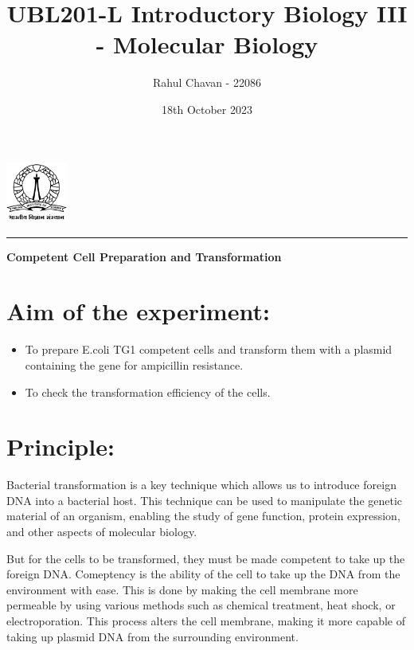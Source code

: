 \documentclass{report}
\title{\textbf{UBL201-L Introductory Biology III - Molecular Biology}}
\author{Rahul Chavan - 22086}
\date{18th October 2023}
\renewcommand{\maketitle}{
 \begin{center}
    \includegraphics[width=2cm]{IISc_Master_Seal_Black.jpg}
    \vspace{0.5cm}

    \Large
    \textbf{\thetitle}
    
    \vspace{0.5cm}
    
    \Large
    \theauthor
    
    \vspace{0.2cm}
    
    \large
    \thedate

    \vspace{0.5cm}

    \hrule  
    
  \end{center}
}
\begin{document}
\maketitle
\begin{center}
    \Large
    \textbf{Competent Cell Preparation and Transformation}
\end{center} 








\section*{Aim of the experiment:}
\begin{itemize}
  \item To prepare E.coli TG1 competent cells and transform them with a plasmid containing the gene for ampicillin resistance.  
  \item To check the transformation efficiency of the cells.
\end{itemize}

\section*{Principle:} 
Bacterial transformation is a key technique which allows us to introduce foreign DNA into a bacterial host.
This technique can be used to manipulate the genetic material of an organism, enabling the study of gene function,
protein expression, and other aspects of molecular biology. 

But for the cells to be transformed, they must be made competent to take up the foreign DNA.
Comeptency is the ability of the cell to take up the DNA from the environment with ease.
This is done by making the cell membrane more permeable by using various methods such as chemical treatment,
heat shock, or electroporation. This process alters the cell membrane, making it more capable of taking up
plasmid DNA from the surrounding environment.
\end{document}
